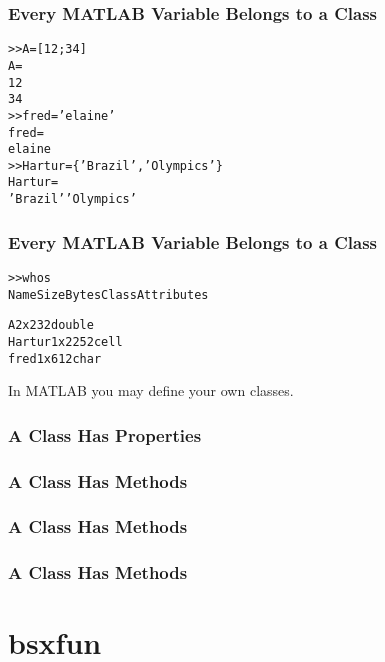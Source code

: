 \documentclass[12pt, compress,xcolor={usenames,dvipsnames}]{beamer} %
\newcommand{\Matlab}{MATLAB\xspace}
\begin{document}
\begin{frame}[fragile]\frametitle{Every \Matlab Variable Belongs to a Class}
	\begin{alltt}
		>> A = [1 2; 3 4]
		A =
		1     2
		3     4
		>> fred = 'elaine'
		fred =
		elaine
		>> Hartur = \{'Brazil','Olympics'\}
		Hartur = 
		'Brazil'    'Olympics'
			\end{alltt}
\end{frame}

\begin{frame}[fragile]\frametitle{Every \Matlab Variable Belongs to a Class}
	\vspace{-5ex}
	\begin{alltt}
		>> whos
		Name        Size            Bytes  Class     Attributes
		
		A           2x2                32  double              
		Hartur      1x2               252  cell                
		fred        1x6                12  char                
	\end{alltt}
	In \Matlab you may define your \alert{own} classes.
\end{frame}


\begin{frame}[fragile]\frametitle{A Class Has Properties}
	\vspace{-8ex}
		
\end{frame}

\begin{frame}[fragile]\frametitle{A Class Has Methods}
	\vspace{-8ex}
		
\end{frame}

\begin{frame}[fragile]\frametitle{A Class Has Methods}
	\vspace{-8ex}
		
\end{frame}

\begin{frame}[fragile]\frametitle{A Class Has Methods}
	\vspace{-8ex}
		
\end{frame}

\section{bsxfun}
\end{document}
